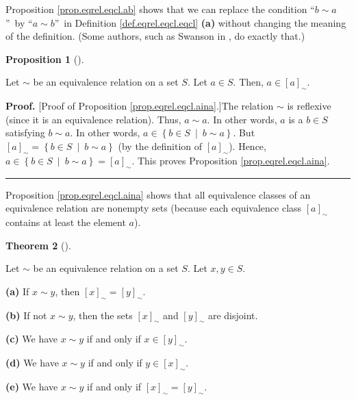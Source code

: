 \documentclass[numbers=enddot,12pt,final,onecolumn,notitlepage]{scrartcl}%
\numberwithin{exer}{subsection}
\theoremstyle{definition}
\newtheorem{theo}{Theorem}[subsection]
\newenvironment{theorem}[1][]
{\begin{theo}[#1]\begin{leftbar}}
{\end{leftbar}\end{theo}}
\newtheorem{prop}[theo]{Proposition}
\newenvironment{proposition}[1][]
{\begin{prop}[#1]\begin{leftbar}}
{\end{leftbar}\end{prop}}
\newenvironment{proof}[1][Proof]{\noindent\textbf{#1.} }{\ \rule{0.5em}{0.5em}}
\begin{document}
Proposition \ref{prop.eqrel.eqcl.ab} shows that we can replace the condition
\textquotedblleft$b\sim a$\textquotedblright\ by \textquotedblleft$a\sim
b$\textquotedblright\ in Definition \ref{def.eqrel.eqcl.eqcl} \textbf{(a)}
without changing the meaning of the definition. (Some authors, such as Swanson
in \cite[Definition 2.3.6]{Swanso18}, do exactly that.)

\begin{proposition}
\label{prop.eqrel.eqcl.aina}Let $\sim$ be an equivalence relation on a set
$S$. Let $a\in S$. Then, $a\in\left[  a\right]  _{\sim}$.
\end{proposition}

\begin{proof}
[Proof of Proposition \ref{prop.eqrel.eqcl.aina}.]The relation $\sim$ is
reflexive (since it is an equivalence relation). Thus, $a\sim a$. In other
words, $a$ is a $b\in S$ satisfying $b\sim a$. In other words, $a\in\left\{
b\in S\ \mid\ b\sim a\right\}  $. But $\left[  a\right]  _{\sim}=\left\{  b\in
S\ \mid\ b\sim a\right\}  $ (by the definition of $\left[  a\right]  _{\sim}%
$). Hence, $a\in\left\{  b\in S\ \mid\ b\sim a\right\}  =\left[  a\right]
_{\sim}$. This proves Proposition \ref{prop.eqrel.eqcl.aina}.
\end{proof}

Proposition \ref{prop.eqrel.eqcl.aina} shows that all equivalence classes of
an equivalence relation are nonempty sets (because each equivalence class
$\left[  a\right]  _{\sim}$ contains at least the element $a$).

\begin{theorem}
\label{thm.eqrel.eqcl.disj}Let $\sim$ be an equivalence relation on a set $S$.
Let $x,y\in S$.

\textbf{(a)} If $x\sim y$, then $\left[  x\right]  _{\sim}=\left[  y\right]
_{\sim}$.

\textbf{(b)} If not $x\sim y$, then the sets $\left[  x\right]  _{\sim}$ and
$\left[  y\right]  _{\sim}$ are disjoint.

\textbf{(c)} We have $x\sim y$ if and only if $x\in\left[  y\right]  _{\sim}$.

\textbf{(d)} We have $x\sim y$ if and only if $y\in\left[  x\right]  _{\sim}$.

\textbf{(e)} We have $x\sim y$ if and only if $\left[  x\right]  _{\sim
}=\left[  y\right]  _{\sim}$.
\end{theorem}
\end{document}
